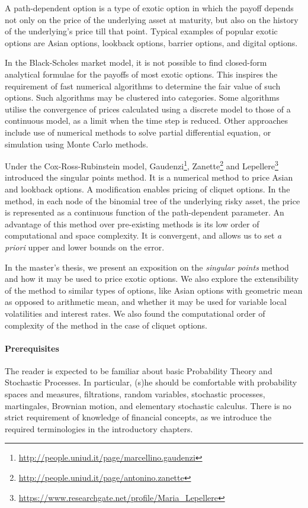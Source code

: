 
A path-dependent option is a type of exotic option in which the payoff depends not only on the price of the underlying asset at maturity, but also on the history of the underlying's price till that point. Typical examples of popular exotic options are Asian options, lookback options, barrier options, and digital options.

In the Black-Scholes market model, it is not possible to find closed-form analytical formulae for the payoffs of most exotic options. This inspires the requirement of fast numerical algorithms to determine the fair value of such options. Such algorithms may be clustered into categories. Some algorithms utilise the convergence of prices calculated using a discrete model to those of a continuous model, as a limit when the time step is reduced. Other approaches include use of numerical methods to solve partial differential equation, or simulation using Monte Carlo methods.

Under the Cox-Ross-Rubinstein model, Gaudenzi\footnote{\url{http://people.uniud.it/page/marcellino.gaudenzi}}, Zanette\footnote{\url{http://people.uniud.it/page/antonino.zanette}} and Lepellere\footnote{\url{https://www.researchgate.net/profile/Maria_Lepellere}} introduced the singular points method. It is a numerical method to price Asian and lookback options. A modification enables pricing of cliquet options. In the method, in each node of the binomial tree of the underlying risky asset, the price is represented as a continuous function of the path-dependent parameter. An advantage of this method over pre-existing methods is its low order of computational and space complexity. It is convergent, and allows us to set \emph{a priori} upper and lower bounds on the error.

In the master's thesis, we present an exposition on the \emph{singular points} method and how it may be used to price exotic options. We also explore the extensibility of the method to similar types of options, like Asian options with geometric mean as opposed to arithmetic mean, and whether it may be used for variable local volatilities and interest rates. We also found the computational order of complexity of the method in the case of cliquet options.


\paragraph{Prerequisites}
The reader is expected to be familiar about basic Probability Theory and Stochastic Processes. In particular, (s)he should be comfortable with probability spaces and measures, filtrations, random variables, stochastic processes, martingales, Brownian motion, and elementary stochastic calculus. There is no strict requirement of knowledge of financial concepts, as we introduce the required terminologies in the introductory chapters.


